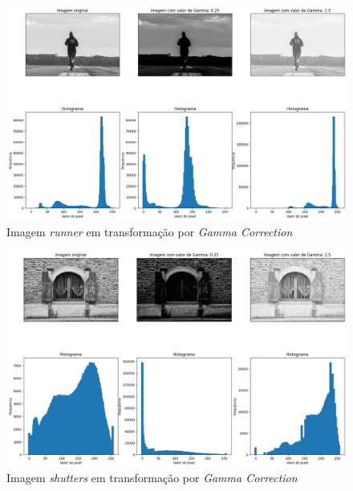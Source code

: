 \begin{figure}
    \includegraphics[width=1\linewidth]{Elementos/Figuras/resultados-gamma-runner.png}
    \caption{Imagem \textit{runner} em transformação por \textit{Gamma Correction}}
    \label{fig:gamma-runner}
\end{figure}

\begin{figure}
    \includegraphics[width=1\linewidth]{Elementos/Figuras/resultados-gamma-shutters.png}
    \caption{Imagem \textit{shutters} em transformação por \textit{Gamma Correction}}
    \label{fig:gamma-shutters}
\end{figure}


